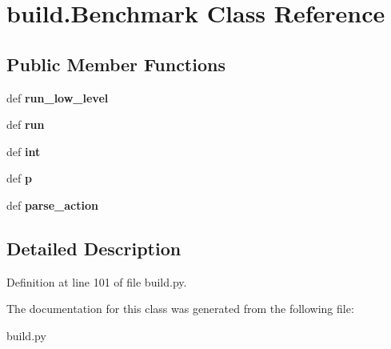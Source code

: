 \hypertarget{classbuild_1_1Benchmark}{\section{build.\-Benchmark \-Class \-Reference}
\label{classbuild_1_1Benchmark}
}
\subsection*{\-Public \-Member \-Functions}
\begin{DoxyCompactItemize}
\item 
\hypertarget{classbuild_1_1Benchmark_aa83f3c52517967b7aaeb6ea896f03feb}{def {\bfseries run\-\_\-low\-\_\-level}}\label{classbuild_1_1Benchmark_aa83f3c52517967b7aaeb6ea896f03feb}

\item 
\hypertarget{classbuild_1_1Benchmark_aaa6c3e07a5f9853f9efa2b8057a1346d}{def {\bfseries run}}\label{classbuild_1_1Benchmark_aaa6c3e07a5f9853f9efa2b8057a1346d}

\item 
\hypertarget{classbuild_1_1Benchmark_a519134bd27acbd705050c16f593bfa82}{def {\bfseries int}}\label{classbuild_1_1Benchmark_a519134bd27acbd705050c16f593bfa82}

\item 
\hypertarget{classbuild_1_1Benchmark_a184359333daaa47e8d2dd22d8065b233}{def {\bfseries p}}\label{classbuild_1_1Benchmark_a184359333daaa47e8d2dd22d8065b233}

\item 
\hypertarget{classbuild_1_1Benchmark_a5b7c8ca2109cdd060640d95f7dab7209}{def {\bfseries parse\-\_\-action}}\label{classbuild_1_1Benchmark_a5b7c8ca2109cdd060640d95f7dab7209}

\end{DoxyCompactItemize}


\subsection{\-Detailed \-Description}


\-Definition at line 101 of file build.\-py.



\-The documentation for this class was generated from the following file\-:\begin{DoxyCompactItemize}
\item 
build.\-py\end{DoxyCompactItemize}
